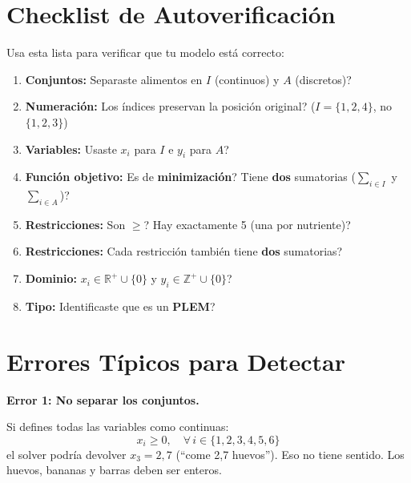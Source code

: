 \documentclass[12pt]{article}
\begin{document}
\section{Checklist de Autoverificaci\'on}

Usa esta lista para verificar que tu modelo est\'a correcto:

\begin{enumerate}[label=\checkmark]
    \item \textbf{Conjuntos:} \textquestiondown Separaste alimentos en $I$ (continuos) y $A$ (discretos)?
    \item \textbf{Numeraci\'on:} \textquestiondown Los \'indices preservan la posici\'on original? ($I = \{1,2,4\}$, no $\{1,2,3\}$)
    \item \textbf{Variables:} \textquestiondown Usaste $x_i$ para $I$ e $y_i$ para $A$?
    \item \textbf{Funci\'on objetivo:} \textquestiondown Es de \textbf{minimizaci\'on}? \textquestiondown Tiene \textbf{dos} sumatorias ($\sum_{i \in I}$ y $\sum_{i \in A}$)?
    \item \textbf{Restricciones:} \textquestiondown Son $\geq$? \textquestiondown Hay exactamente 5 (una por nutriente)?
    \item \textbf{Restricciones:} \textquestiondown Cada restricci\'on tambi\'en tiene \textbf{dos} sumatorias?
    \item \textbf{Dominio:} \textquestiondown $x_i \in \mathbb{R}^+ \cup \{0\}$ y $y_i \in \mathbb{Z}^+ \cup \{0\}$?
    \item \textbf{Tipo:} \textquestiondown Identificaste que es un \textbf{PLEM}?
\end{enumerate}

\section{Errores T\'ipicos para Detectar}

\begin{cajaroja}
\textbf{Error 1: No separar los conjuntos.}

Si defines todas las variables como continuas:
\[
    x_i \geq 0, \quad \forall\, i \in \{1, 2, 3, 4, 5, 6\}
\]
el solver podr\'ia devolver $x_3 = 2{,}7$ (``come 2,7 huevos''). Eso no tiene sentido. Los huevos, bananas y barras deben ser enteros.
\end{cajaroja}
\end{document}
